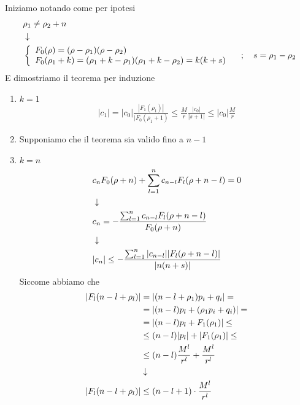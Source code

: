Iniziamo notando come per ipotesi
\begin{align}
	&\rho_1 \neq \rho_2 +n \firstpassage
	& \double{F_0(\rho) = (\rho - \rho_1)(\rho - \rho_2)\hfill }{F_0(\rho_1 +k) = (\rho_1 + k- \rho_1)(\rho_1 + k- \rho_2) = k (k+s)} \spacer s = \rho_1 - \rho_2
\end{align}
E dimostriamo il teorema per induzione
\begin{enumerate}
	\item $k=1$
	\begin{align}
		|c_1| = |c_0| \frac{|F_1(\rho_1)|}{|F_0(\rho_1 + 1)} \leq \frac{M}{r} \frac{|c_0|}{|s+1|} \leq |c_0| \frac{M}{r}
	\end{align}
	\item Supponiamo che il teorema sia valido fino a $n-1$
	\item $k=n$
	\begin{align}
		&c_n F_0(\rho + n) + \sum_{l=1}^{n} c_{n-l} F_l (\rho + n -l ) = 0\\ &\downarrow \nonumber \\
		&c_n  = - \frac{\sum_{l=1}^{n} c_{n-l} F_l (\rho + n -l )}{F_0(\rho + n)}\nonumber \\ &\downarrow \nonumber \\
		&|c_n|  \leq - \frac{\sum_{l=1}^{n} |c_{n-l}| |F_l (\rho + n -l )|}{|n(n+s)|}
	\end{align}
	Siccome abbiamo che
	\begin{align}
		|F_l (n-l + \rho_l)| &= |(n-l+\rho_1)p_i + q_i| =\nonumber \\
							 &= |(n-l)p_l + (\rho_1p_i + q_i)| =\nonumber \\
							 &= |(n-l)p_l + F_1(\rho_1)| \leq \nonumber\\
							 &\leq (n-l)|p_l| + |F_1(\rho_1)| \leq \nonumber\\
							 &\leq (n-l) \frac{M^l}{r^l} + \frac{M^l}{r^l}\\ &\downarrow \nonumber \\
		|F_l (n-l + \rho_l)| &\leq (n-l+1) \cdot \frac{M^l}{r^l}	  
	\end{align}


\end{enumerate}
